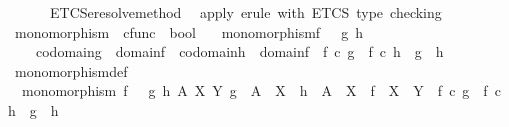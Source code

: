 \begin{isabellebody}
\ \ \ \ \ {\isachargreater}{\kern0pt}{\isachargreater}{\kern0pt}\ ETCS{\isacharunderscore}{\kern0pt}eresolve{\isacharunderscore}{\kern0pt}method{\isacartoucheclose}\isanewline
\ \ {\isachardoublequoteopen}apply\ erule\ with\ ETCS\ type\ checking{\isachardoublequoteclose}%
\endisatagML
{\isafoldML}%
%
\isadelimML
%
\endisadelimML
%
\isadelimdocument
%
\endisadelimdocument
%
\isatagdocument
%
\isamarkuptrue%
%
\endisatagdocument
{\isafolddocument}%
%
\isadelimdocument
%
\endisadelimdocument
{}\isamarkupfalse%
\ monomorphism\ {\isacharcolon}{\kern0pt}{\isacharcolon}{\kern0pt}\ {\isachardoublequoteopen}cfunc\ {\isasymRightarrow}\ bool{\isachardoublequoteclose}\ \isanewline
\ \ {\isachardoublequoteopen}monomorphism{\isacharparenleft}{\kern0pt}f{\isacharparenright}{\kern0pt}\ {\isasymlongleftrightarrow}\ {\isacharparenleft}{\kern0pt}{\isasymforall}\ g\ h{\isachardot}{\kern0pt}\ \isanewline
\ \ \ \ {\isacharparenleft}{\kern0pt}codomain{\isacharparenleft}{\kern0pt}g{\isacharparenright}{\kern0pt}\ {\isacharequal}{\kern0pt}\ domain{\isacharparenleft}{\kern0pt}f{\isacharparenright}{\kern0pt}\ {\isasymand}\ codomain{\isacharparenleft}{\kern0pt}h{\isacharparenright}{\kern0pt}\ {\isacharequal}{\kern0pt}\ domain{\isacharparenleft}{\kern0pt}f{\isacharparenright}{\kern0pt}{\isacharparenright}{\kern0pt}\ {\isasymlongrightarrow}\ {\isacharparenleft}{\kern0pt}f\ {\isasymcirc}\isactrlsub c\ g\ {\isacharequal}{\kern0pt}\ f\ {\isasymcirc}\isactrlsub c\ h\ {\isasymlongrightarrow}\ g\ {\isacharequal}{\kern0pt}\ h{\isacharparenright}{\kern0pt}{\isacharparenright}{\kern0pt}{\isachardoublequoteclose}\isanewline
\isanewline
{}\isamarkupfalse%
\ monomorphism{\isacharunderscore}{\kern0pt}def{}{\isacharcolon}{\kern0pt}\isanewline
\ \ {\isachardoublequoteopen}monomorphism\ f\ {\isasymlongleftrightarrow}\ {\isacharparenleft}{\kern0pt}{\isasymforall}\ g\ h\ A\ X\ Y{\isachardot}{\kern0pt}\ g\ {\isacharcolon}{\kern0pt}\ A\ {\isasymrightarrow}\ X\ {\isasymand}\ h\ {\isacharcolon}{\kern0pt}\ A\ {\isasymrightarrow}\ X\ {\isasymand}\ f\ {\isacharcolon}{\kern0pt}\ X\ {\isasymrightarrow}\ Y\ {\isasymlongrightarrow}\ {\isacharparenleft}{\kern0pt}f\ {\isasymcirc}\isactrlsub c\ g\ {\isacharequal}{\kern0pt}\ f\ {\isasymcirc}\isactrlsub c\ h\ {\isasymlongrightarrow}\ g\ {\isacharequal}{\kern0pt}\ h{\isacharparenright}{\kern0pt}{\isacharparenright}{\kern0pt}{\isachardoublequoteclose}\isanewline
%
\isadelimproof
\ \ %
\endisadelimproof
%
\isatagproof
{}\isamarkupfalse%

\end{isabellebody}
